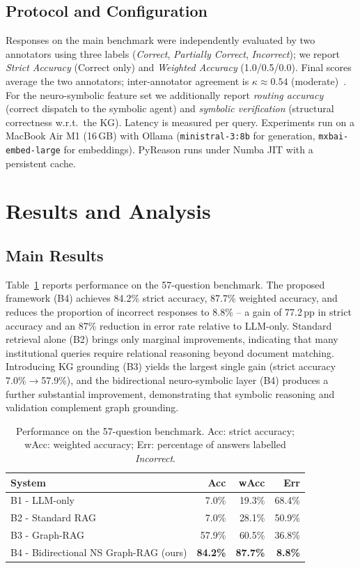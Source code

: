 \documentclass[12pt]{article}
\begin{document}
\subsection{Protocol and Configuration}

Responses on the main benchmark were independently evaluated by two annotators using three labels (\textit{Correct}, \textit{Partially Correct}, \textit{Incorrect}); we report \textit{Strict Accuracy} (Correct only) and \textit{Weighted Accuracy} (1.0/0.5/0.0). Final scores average the two annotators; inter-annotator agreement is $\kappa\approx 0.54$ (moderate)~\cite{cohen1960}. For the neuro-symbolic feature set we additionally report \emph{routing accuracy} (correct dispatch to the symbolic agent) and \emph{symbolic verification} (structural correctness w.r.t.\ the KG). Latency is measured per query. Experiments run on a MacBook Air M1 (16\,GB) with Ollama (\texttt{ministral-3:8b} for generation, \texttt{mxbai-embed-large} for embeddings). PyReason runs under Numba JIT with a persistent cache.


\section{Results and Analysis}

\subsection{Main Results}

Table~\ref{tab:results} reports performance on the 57-question benchmark. The proposed framework (B4) achieves 84.2\% strict accuracy, 87.7\% weighted accuracy, and reduces the proportion of incorrect responses to 8.8\% -- a gain of 77.2\,pp in strict accuracy and an 87\% reduction in error rate relative to LLM-only. Standard retrieval alone (B2) brings only marginal improvements, indicating that many institutional queries require relational reasoning beyond document matching. Introducing KG grounding (B3) yields the largest single gain (strict accuracy 7.0\%$\rightarrow$57.9\%), and the bidirectional neuro-symbolic layer (B4) produces a further substantial improvement, demonstrating that symbolic reasoning and validation complement graph grounding.

\begin{table}[ht]
\centering
\caption{Performance on the 57-question benchmark. Acc: strict accuracy; wAcc: weighted accuracy; Err: percentage of answers labelled \textit{Incorrect}.}
\label{tab:results}
\begin{tabular}{lrrr}
\hline
\textbf{System} & \textbf{Acc} & \textbf{wAcc} & \textbf{Err} \\
\hline
B1 - LLM-only & 7.0\% & 19.3\% & 68.4\% \\
B2 - Standard RAG & 7.0\% & 28.1\% & 50.9\% \\
B3 - Graph-RAG & 57.9\% & 60.5\% & 36.8\% \\
B4 - Bidirectional NS Graph-RAG (ours) & \textbf{84.2\%} & \textbf{87.7\%} & \textbf{8.8\%} \\
\hline
\end{tabular}
\end{table}
\end{document}
